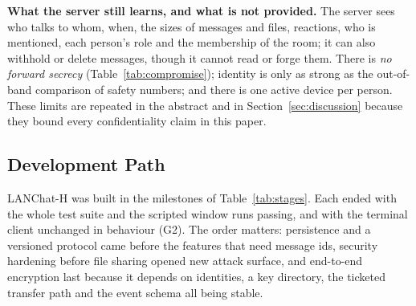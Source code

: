 \documentclass[conference]{IEEEtran}
\begin{document}
\textbf{What the server still learns, and what is not provided.} The server sees who talks to whom, when, the sizes of messages and files, reactions, who is mentioned, each person's role and the membership of the room; it can also withhold or delete messages, though it cannot read or forge them. There is \emph{no forward secrecy} (Table~\ref{tab:compromise}); identity is only as strong as the out-of-band comparison of safety numbers; and there is one active device per person. These limits are repeated in the abstract and in Section~\ref{sec:discussion} because they bound every confidentiality claim in this paper.

\subsection{Development Path}\label{sec:path}
LANChat-H was built in the milestones of Table~\ref{tab:stages}. Each ended with the whole test suite and the scripted window runs passing, and with the terminal client unchanged in behaviour (G2). The order matters: persistence and a versioned protocol came before the features that need message ids, security hardening before file sharing opened new attack surface, and end-to-end encryption last because it depends on identities, a key directory, the ticketed transfer path and the event schema all being stable.
\end{document}
